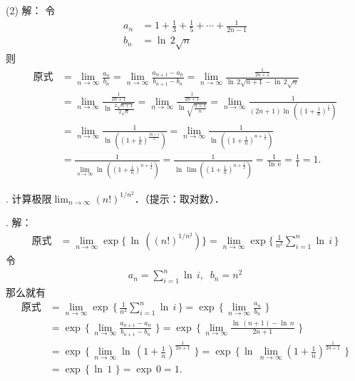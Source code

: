\noindent (2) 解：
令
\begin{align}
    a_n &= 1 + \frac{1}{3} + \frac{1}{5} + \cdots + \frac{1}{2n-1} \\
    b_n &= \ln \, 2\sqrt{n}
\end{align}
则
\begin{align}
    \text{原式} &= \lim_{n \to \infty} \frac{a_n}{b_n} = \lim_{n \to \infty} \frac{a_{n+1} - a_n}{b_{n+1} - b_n} = \lim_{n \to \infty} \frac{\displaystyle \frac{1}{2n+1}}{\ln \, 2\sqrt{n+1} - \ln \, 2 \sqrt{n}} \\
    &= \lim_{n \to \infty} \frac{\displaystyle\frac{1}{2n+1}}{\ln \, \displaystyle\frac{2\sqrt{n+1}}{2\sqrt{n}}} = \lim_{n \to \infty} \frac{\displaystyle\frac{1}{2n+1}}{\ln \sqrt{\displaystyle\frac{n+1}{n}}} = \lim_{n \to \infty} \frac{1}{(2n+1) \ln \, \left(\left(1 + \displaystyle\frac{1}{n}\right)^{\frac{1}{2}} \right)} \\
    &= \lim_{n \to \infty} \frac{1}{\ln \, \left( \left(1+\displaystyle\frac{1}{n}\right)^{\frac{2n+1}{2}}\right)} = \lim_{n \to \infty} \frac{1}{\ln \, \left(\left(1+\displaystyle\frac{1}{n}\right)^{n+\frac{1}{2}}\right)} \\
    &= \frac{1}{\displaystyle\lim_{n \to \infty} \ln \, \left(\left(1+\displaystyle\frac{1}{n}\right)^{n+\frac{1}{2}}\right)} = \frac{1}{\ln \, \displaystyle\lim \left( \left( 1 + \displaystyle\frac{1}{n}\right)^{n+\frac{1}{2}}\right)} = \frac{1}{\ln \, \mathrm{e}} = \frac{1}{1} = 1.
\end{align}

. 计算极限$\displaystyle\lim_{n \to \infty} \left( n! \right)^{1/n^2}$．（提示：取对数）．

. 解：
\begin{align}
    \text{原式} &= \lim_{n \to \infty} \exp \{ \, \ln \, \left( (n!)^{1/n^2}\right) \} = \lim_{n \to \infty} \exp \{ \, \displaystyle\frac{1}{n^2} \displaystyle\sum_{i=1}^{n} \ln \, i \, \}
\end{align}
令
\begin{align}
    a_n = \sum_{i=1}^n \ln \, i,  \;\; b_n = n^2
\end{align}
那么就有
\begin{align}
    \text{原式} &= \lim_{n \to \infty} \exp \, \{ \, \displaystyle\frac{1}{n^2} \displaystyle\sum_{i=1}^{n} \ln \, i \, \} = \exp \, \{ \, \displaystyle\lim_{n \to \infty} \displaystyle\frac{a_n}{b_n} \,\, \} \\
    &= \exp \, \{ \, \displaystyle\lim_{n \to \infty} \displaystyle\frac{a_{n+1}-a_n}{b_{n+1}-b_n} \,\, \} = \exp \, \{ \, \displaystyle\lim_{n \to \infty} \displaystyle\frac{\ln \, \left(n+1\right) - \ln \, n}{2n + 1} \,\, \} \\
    &= \exp \, \{ \, \displaystyle\lim_{n \to \infty} \ln \, \left( 1 + \displaystyle\frac{1}{n} \right)^{\frac{1}{2n+1}} \,\, \} = \exp \, \{ \, \ln \, \displaystyle\lim_{n \to \infty} \left( 1 + \displaystyle\frac{1}{n} \right)^{\frac{1}{2n+1}} \,\, \} \\
    &= \exp \, \{ \, \ln \, 1 \,\, \} = \exp \, 0 = 1.
\end{align}

